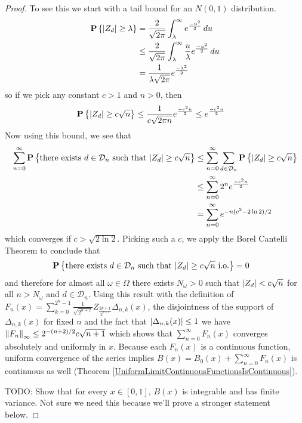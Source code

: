 \begin{proof}
To see this we start with a tail bound for an $N(0,1)$ distribution.  
\begin{align*}
\textbf{P}\left \{\left \vert Z_d \right \vert \geq \lambda \right \} &= \frac{2}{\sqrt{2\pi}} \int_\lambda^\infty
e^{\frac{-u^2}{2}} \, du \\
&\leq  \frac{2}{\sqrt{2\pi}} \int_\lambda^\infty
\frac{u}{\lambda} e^{\frac{-u^2}{2}} \, du \\
&= \frac{1}{\lambda\sqrt{2\pi}} e^{\frac{-\lambda^2}{2}}
\end{align*}
so if we pick any constant $c > 1$ and $n > 0$, then 
\begin{align*}
\textbf{P}\left \{\left \vert Z_d \right \vert \geq c \sqrt{n} \right \} &\leq \frac{1}{c\sqrt{2\pi n}}
e^{\frac{-c^2 n}{2}} \leq e^{\frac{-c^2 n}{2}}
\end{align*}
Now using this bound, we see that
\begin{align*}
\sum_{n=0}^\infty \textbf{P}\left \{ \text {there exists $d \in
    \mathcal{D}_n$ such that $\left \vert Z_d \right \vert \geq c \sqrt{n}$} \right \} &\leq
\sum_{n=0}^\infty  \sum_{d \in \mathcal{D}_n} \textbf{P}\left \{\left \vert Z_d \right \vert
  \geq c \sqrt{n} \right \} \\
&\leq \sum_{n=0}^\infty 2^n e^{\frac{-c^2 n}{2}} \\
&= \sum_{n=0}^\infty
e^{-n(c^2 - 2\ln2)/2} 
\end{align*}
which converges if $c > \sqrt{2\ln2}$.  Picking such a $c$, we apply
the Borel Cantelli Theorem to conclude that 
\begin{align*}
\textbf{P}\left \{ \text {there exists $d \in
    \mathcal{D}_n$ such that $\left \vert Z_d \right \vert \geq c \sqrt{n}$ i.o.} \right \} &= 0
\end{align*}
and therefore for almost all $\omega \in \Omega$ there exists
$N_\omega > 0$ such that $\left \vert Z_d \right \vert < c \sqrt{n}$ for all $n >
N_\omega$ and $d \in \mathcal{D}_n$.  Using this result with the definition of
$F_n(x)=\sum_{k=0}^{2^n-1}
\frac{1}{\sqrt{2^{n+2}}}Z_{\frac{2k+1}{2^{n+1}}} \Delta_{n,k}(x)$, the
disjointness of the support of $\Delta_{n,k}(x)$ for fixed $n$ and the
fact that $\left \vert \Delta_{n,k}(x) \right \vert \leq 1$ we
have $\left \lVert F_n \right \rVert_\infty \leq 2^{-(n+2)/2} c \sqrt{n+1}$ which shows that
$\sum_{n=0}^\infty F_n(x)$ converges absolutely and uniformly in $x$.
Because each $F_n(x)$ is a continuous function, uniform convergence of
the series implies $B(x) = B_0(x) + \sum_{n=0}^\infty F_n(x)$ is continuous as
well (Theorem \ref{UniformLimitContinuousFunctionsIsContinuous}).

TODO: Show that for every $x \in [0,1]$, $B(x)$ is integrable and
has finite variance.  Not sure we need this because we'll prove a
stronger statement below.


\end{proof}
